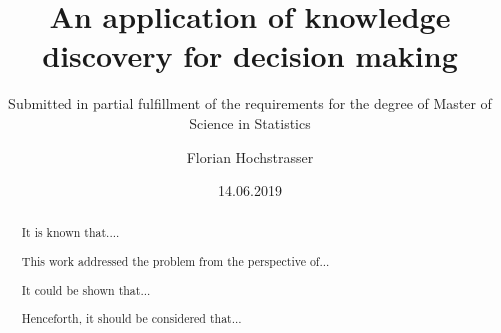 \begin{titlepage}

\titlehead{Master Thesis}
\subject{Profit maximisation for direct marketing campaigns}
\title{An application of knowledge discovery for decision making}
\subtitle{Submitted in partial fulfillment of the requirements for the degree of Master of Science in Statistics}
\author{Florian Hochstrasser}
\date{14.06.2019}
\publishers{Supervisor: Jacques Zuber}

\end{titlepage}

\let\maketitle\oldmaketitle
\maketitle

\begin{abstract}

It is known that....

This work addressed the problem from the perspective of...

It could be shown that...

Henceforth, it should be considered that...
\end{abstract}
